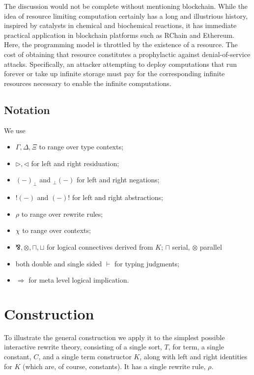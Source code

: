 \documentclass{llncs}
\renewcommand{\:}{\colon}
\begin{document}
The discussion would not be complete without mentioning
blockchain. While the idea of resource limiting computation certainly
has a long and illustrious history, inspired by catalysts in chemical
and biochemical reactions, it has immediate practical application in
blockchain platforms such as RChain and Ethereum. Here, the
programming model is throttled by the existence of a resource. The
cost of obtaining that resource constitutes a prophylactic against
denial-of-service attacks. Specifically, an attacker attempting to
deploy computations that run forever or take up infinite storage must
pay for the corresponding infinite resources necessary to enable the
infinite computations.

\subsection{Notation}
We use 

\begin{itemize}
  \item $\Gamma , \Delta , \Xi$  to range over type contexts;
  \item $\rhd , \lhd$ for left and right residuation;
  \item $(-)_{\perp}$ and $ _{\perp}(-)$  for left and right negations;
  \item $!(-)$ and $(-)!$  for left and right abstractions; 
  \item $\rho$ to range over rewrite rules;
  \item $\chi$ to range over contexts;
  \item $\bindnasrepma, \otimes, \sqcap, \sqcup$ for logical connectives derived from $K$; $\sqcap$ serial, $\otimes$ parallel
  \item both double and single sided $\vdash$ for typing judgments;
  \item $\Rightarrow$ for meta level logical implication.
\end{itemize}

\section{Construction}
To illustrate the general construction we apply it to the simplest
possible interactive rewrite theory, consisting of a single sort, $T$,
for term, a single constant, $C$, and a single term constructor $K$, along
with left and right identities for $K$ (which are, of course,
constants). It has a single rewrite rule, $\rho$.
\end{document}
